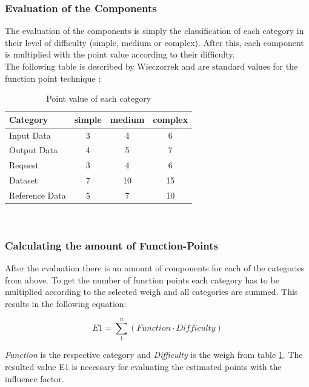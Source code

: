 \subsubsection{Evaluation of the Components}

The evaluation of the components is simply the classification of each category in their level of difficulty (simple, medium or complex). After this, each component is multiplied with the point value according to their difficulty. \\
The following table is described by Wieczorrek and are standard values for the function point technique \cite{fpafundamentals}:\\
\begin{table}[h] 
	\centering 
	\setlength{\tabcolsep}{4pt}
	\begin{tabular}{|l|c|c|c|}\hline
		Category & simple & medium & complex \\ \hline
		Input Data & 3 & 4 & 6\\ \hline
		Output Data & 4 & 5 & 7\\ \hline
		Request & 3 & 4 & 6\\ \hline
		Dataset & 7 & 10 & 15\\ \hline
		Reference Data & 5 & 7 & 10\\ \hline
	\end{tabular}
	\caption{Point value of each category} 
	\label{tab:pointvalues} 
\end{table} \\

\subsubsection{ Calculating the amount of Function-Points}

After the evaluation there is an amount of components for each of the categories from above. To get the number of function points each category has to be multiplied according to the selected weigh and all categories are summed. This results in the following equation:

\begin{equation}
	\textit{E1} =  \sum \limits_{1}^n  (\textit{Function} \cdot \textit{Difficulty}) \label{fp:E1}
\end{equation}

\textit{Function} is the respective category and \textit{Difficulty} is the weigh from table \ref{tab:pointvalues}. The resulted value E1 is necessary for evaluating the estimated points with the influence factor.

